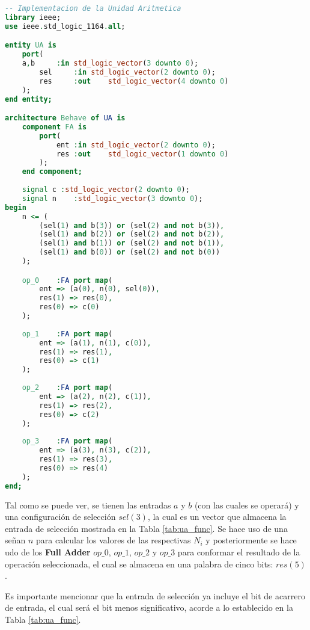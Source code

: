 \documentclass[../procedimientos.tex]{subfiles}
\begin{document}
\begin{lstlisting}[language=VHDL]
-- Implementacion de la Unidad Aritmetica
library ieee;
use ieee.std_logic_1164.all;

entity UA is
	port(
    a,b		:in	std_logic_vector(3 downto 0);
		sel		:in	std_logic_vector(2 downto 0);
		res		:out	std_logic_vector(4 downto 0)
	);
end entity;

architecture Behave of UA is
	component FA is
		port(
			ent	:in	std_logic_vector(2 downto 0);
			res	:out	std_logic_vector(1 downto 0)
		);
	end component;
	
	signal c :std_logic_vector(2 downto 0);
	signal n	:std_logic_vector(3 downto 0);
begin
	n <= (
		(sel(1) and b(3)) or (sel(2) and not b(3)),
		(sel(1) and b(2)) or (sel(2) and not b(2)),
		(sel(1) and b(1)) or (sel(2) and not b(1)),
		(sel(1) and b(0)) or (sel(2) and not b(0))
	);

	op_0	:FA port map(
		ent => (a(0), n(0), sel(0)),
		res(1) => res(0),
		res(0) => c(0)
	);
	
	op_1	:FA port map(
		ent => (a(1), n(1), c(0)),
		res(1) => res(1),
		res(0) => c(1)
	);
	
	op_2	:FA port map(
		ent => (a(2), n(2), c(1)),
		res(1) => res(2),
		res(0) => c(2)
	);
	
	op_3	:FA port map(
		ent => (a(3), n(3), c(2)),
		res(1) => res(3),
		res(0) => res(4)
	);
end;
\end{lstlisting}

Tal como se puede ver, se tienen las entradas $a$ y $b$ (con las cuales se 
operará) y una configuración de selección $sel(3)$, la cual es un vector que 
almacena la entrada de selección mostrada en la Tabla \ref{tab:ua_func}.  Se 
hace uso de una señan $n$ para calcular los valores de las respectivas $N_i$ y 
posteriormente se hace udo de los \textbf{Full Adder} $op\_0$, $op\_1$, 
$op\_2$ y $op\_3$ para conformar el resultado de la operación seleccionada, el 
cual se almacena en una palabra de cinco bits: $res(5)$.

Es importante mencionar que la entrada de selección ya incluye el bit de 
acarrero de entrada, el cual será el bit menos significativo, acorde a lo 
establecido en la Tabla \ref{tab:ua_func}.
\end{document}
